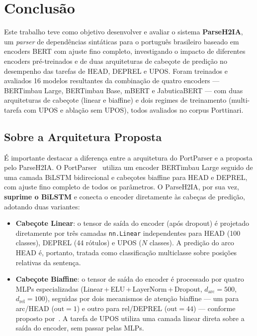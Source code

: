 
\chapter{Conclusão}
\label{cap:conclusao}

Este trabalho teve como objetivo desenvolver e avaliar o sistema \textbf{ParseH2IA}, um
\textit{parser} de dependências sintáticas para o português brasileiro baseado em encoders
BERT com ajuste fino completo, investigando o impacto de diferentes encoders pré-treinados e
de duas arquiteturas de cabeçote de predição no desempenho das tarefas de HEAD, DEPREL e
UPOS. Foram treinados e avaliados 16 modelos resultantes da combinação de quatro encoders
— BERTimbau Large, BERTimbau Base, mBERT e JabuticaBERT — com duas arquiteturas de cabeçote
(linear e biaffine) e dois regimes de treinamento (multi-tarefa com UPOS e ablação sem UPOS),
todos avaliados no corpus Porttinari.

\section{Sobre a Arquitetura Proposta}
\label{sec:arq_proposta}

É importante destacar a diferença entre a arquitetura do PortParser e a proposta pelo ParseH2IA.
O PortParser~\citep{lopes2024towards} utiliza um encoder BERTimbau Large seguido de uma camada
BiLSTM bidirecional e cabeçotes biaffine para HEAD e DEPREL, com ajuste fino completo de todos
os parâmetros. O ParseH2IA, por sua vez, \textbf{suprime o BiLSTM} e conecta o encoder
diretamente às cabeças de predição, adotando duas variantes:

\begin{itemize}
  \item \textbf{Cabeçote Linear}: o tensor de saída do encoder (após dropout) é projetado
        diretamente por três camadas \texttt{nn.Linear} independentes para HEAD (100 classes),
        DEPREL (44 rótulos) e UPOS ($N$ classes). A predição do arco HEAD é, portanto,
        tratada como classificação multiclasse sobre posições relativas da sentença.

  \item \textbf{Cabeçote Biaffine}: o tensor de saída do encoder é processado por quatro
        MLPs especializadas (Linear\,+\,ELU\,+\,LayerNorm\,+\,Dropout,
        $d_\text{arc}=500$, $d_\text{rel}=100$), seguidas por dois mecanismos de atenção
        biaffine — um para arc/HEAD ($\text{out}=1$) e outro para rel/DEPREL
        ($\text{out}=44$) — conforme proposto por~\citet{dozat2016deep}. A tarefa de UPOS
        utiliza uma camada linear direta sobre a saída do encoder, sem passar pelas MLPs.
\end{itemize}

